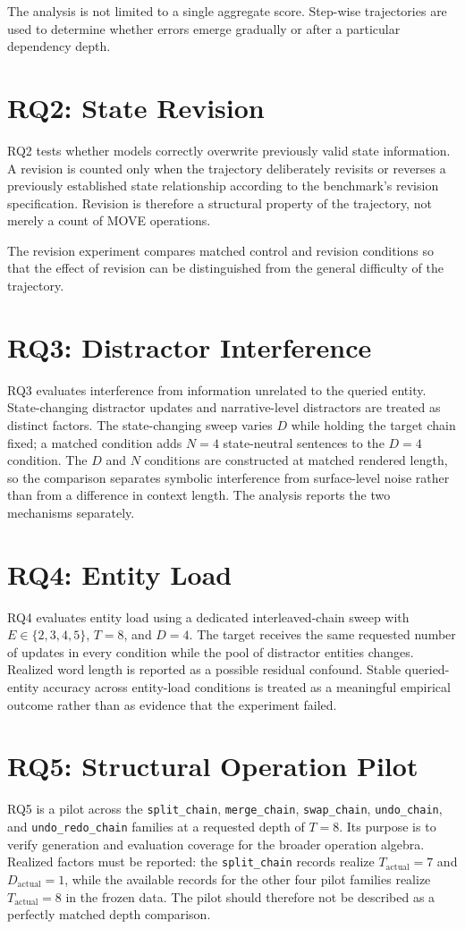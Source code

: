 \documentclass{iutbscthesis}
\begin{document}
The analysis is not limited to a single aggregate score. Step-wise trajectories are used to determine
whether errors emerge gradually or after a particular dependency depth.

\section{RQ2: State Revision}
RQ2 tests whether models correctly overwrite previously valid state information. A revision is counted
only when the trajectory deliberately revisits or reverses a previously established state relationship
according to the benchmark's revision specification. Revision is therefore a structural property of
the trajectory, not merely a count of MOVE operations.

The revision experiment compares matched control and revision conditions so that the effect of revision
can be distinguished from the general difficulty of the trajectory.

\section{RQ3: Distractor Interference}
RQ3 evaluates interference from information unrelated to the queried entity. State-changing distractor
updates and narrative-level distractors are treated as distinct factors. The state-changing sweep
varies $D$ while holding the target chain fixed; a matched condition adds $N=4$ state-neutral sentences
to the $D=4$ condition. The $D$ and $N$ conditions are constructed at matched rendered length, so the
comparison separates symbolic interference from surface-level noise rather than from a difference in
context length. The analysis reports the two mechanisms separately.

\section{RQ4: Entity Load}
RQ4 evaluates entity load using a dedicated interleaved-chain sweep with $E\in\{2,3,4,5\}$,
$T=8$, and $D=4$. The target receives the same requested number of updates in every condition while
the pool of distractor entities changes. Realized word length is reported as a possible residual
confound. Stable queried-entity accuracy across entity-load conditions is treated as a meaningful
empirical outcome rather than as evidence that the experiment failed.

\section{RQ5: Structural Operation Pilot}
RQ5 is a pilot across the \texttt{split\_chain}, \texttt{merge\_chain}, \texttt{swap\_chain},
\texttt{undo\_chain}, and \texttt{undo\_redo\_chain} families at a requested depth of $T=8$. Its purpose is to verify generation and
evaluation coverage for the broader operation algebra. Realized factors must be reported: the
\texttt{split\_chain} records realize $T_{\mathrm{actual}}=7$ and $D_{\mathrm{actual}}=1$, while the
available records for the other four pilot families realize $T_{\mathrm{actual}}=8$ in the frozen data.
The pilot should therefore not be described as a perfectly matched depth comparison.
\end{document}
